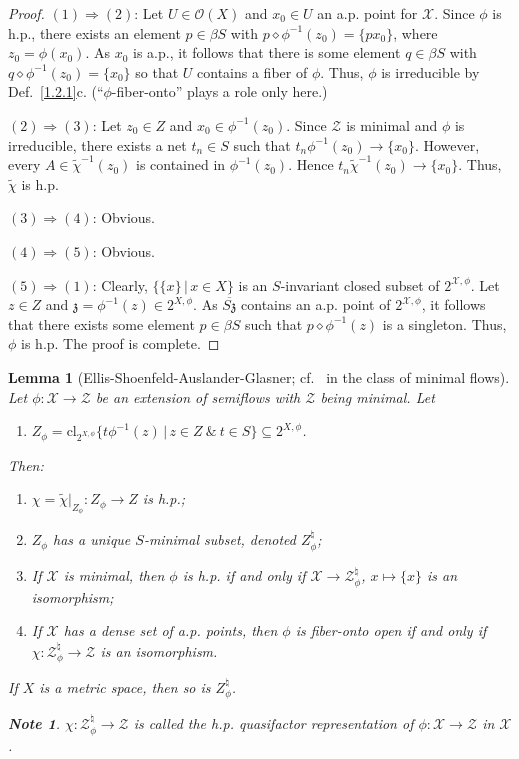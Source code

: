 \documentclass[12pt,final,3p,times]{elsarticle}
\newtheorem{slem}[sthm]{Lemma}
\theoremstyle{definition}
\newtheorem*{xnote}{Note}
\numberwithin{equation}{section}
\begin{document}
\begin{proof}
$(1)\Rightarrow(2)$: Let $U\in\mathscr{O}(X)$ and $x_0\in U$ an a.p. point for $\mathscr{X}$. Since $\phi$ is h.p., there exists an element $p\in\beta S$ with $p\diamond\phi^{-1}(z_0)=\{px_0\}$, where $z_0=\phi(x_0)$. As $x_0$ is a.p., it follows that there is some element $q\in\beta S$ with $q\diamond\phi^{-1}(z_0)=\{x_0\}$ so that $U$ contains a fiber of $\phi$. Thus, $\phi$ is irreducible by Def.~\ref{1.2.1}c. (``$\phi$-fiber-onto'' plays a role only here.)

$(2)\Rightarrow(3)$: Let $z_0\in Z$ and $x_0\in\phi^{-1}(z_0)$. Since $\mathscr{Z}$ is minimal and $\phi$ is irreducible, there exists a net $t_n\in S$ such that $t_n\phi^{-1}(z_0)\to\{x_0\}$. However, every $A\in\tilde{\chi}^{-1}(z_0)$ is contained in $\phi^{-1}(z_0)$. Hence $t_n\tilde{\chi}^{-1}(z_0)\to\{x_0\}$. Thus, $\tilde{\chi}$ is h.p.

$(3)\Rightarrow(4)$: Obvious.

$(4)\Rightarrow(5)$: Obvious. 

$(5)\Rightarrow(1)$: Clearly, $\{\{x\}\,|\,x\in X\}$ is an $S$-invariant closed subset of $2^{\mathscr{X},\phi}$. Let $z\in Z$ and $\mathfrak{z}=\phi^{-1}(z)\in 2^{X,\phi}$. As $\overline{S\mathfrak{z}}$ contains an a.p. point of $2^{\mathscr{X},\phi}$, it follows that there exists some element $p\in\beta S$ such that $p\diamond\phi^{-1}(z)$ is a singleton. Thus, $\phi$ is h.p. The proof is complete.
\end{proof}

\begin{slem}[{Ellis-Shoenfeld-Auslander-Glasner; cf.~\cite{S76, AG77, Wo} in the class of minimal flows}]\label{P2.3.4}
Let $\phi\colon\mathscr{X}\rightarrow\mathscr{Z}$ be an extension of semiflows with $\mathscr{Z}$ being minimal. Let
\begin{enumerate}
\item[] $Z_\phi=\mathrm{cl}_{2^{X,\phi}}\{t\phi^{-1}(z)\,|\,z\in Z\ \&\  t\in S\}\subseteq2^{X,\phi}$.
\end{enumerate}
Then:
\begin{enumerate}[(1)]
\item $\chi=\tilde{\chi}|_{Z_\phi}\colon Z_\phi\rightarrow Z$ is h.p.;
\item $Z_\phi$ has a unique $S$-minimal subset, denoted $Z_\phi^\natural$;
\item If $\mathscr{X}$ is minimal, then $\phi$ is h.p. if and only if $\mathscr{X}\rightarrow\mathscr{Z}_\phi^\natural$, $x\mapsto\{x\}$ is an isomorphism;
\item If $\mathscr{X}$ has a dense set of a.p. points, then $\phi$ is fiber-onto open if and only if $\chi\colon\mathscr{Z}_\phi^\natural\rightarrow\mathscr{Z}$ is an isomorphism.
\end{enumerate}
If $X$ is a metric space, then so is $Z_\phi^\natural$.
\begin{xnote}
$\chi\colon \mathscr{Z}_\phi^\natural\rightarrow\mathscr{Z}$  is called the h.p. quasifactor representation of $\phi\colon\mathscr{X}\rightarrow\mathscr{Z}$ in $\mathscr{X}$.
\end{xnote}
\end{slem}
\end{document}
